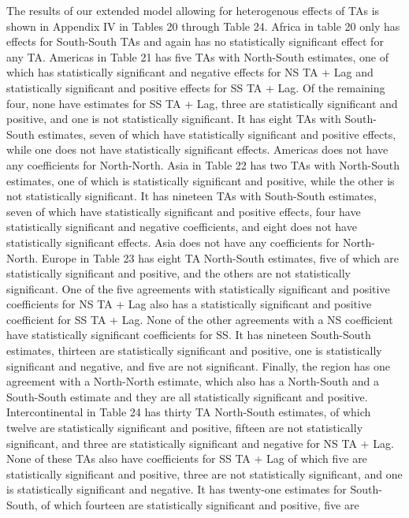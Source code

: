 The results of our extended model allowing for heterogenous effects of
TAs is shown in Appendix IV in Tables 20 through Table 24. Africa in
table 20 only has effects for South-South TAs and again has no
statistically significant effect for any TA. Americas in Table 21 has
five TAs with North-South estimates, one of which has statistically
significant and negative effects for NS TA + Lag and statistically
significant and positive effects for SS TA + Lag. Of the remaining four,
none have estimates for SS TA + Lag, three are statistically significant
and positive, and one is not statistically significant. It has eight TAs
with South-South estimates, seven of which have statistically
significant and positive effects, while one does not have statistically
significant effects. Americas does not have any coefficients for
North-North. Asia in Table 22 has two TAs with North-South estimates,
one of which is statistically significant and positive, while the other
is not statistically significant. It has nineteen TAs with South-South
estimates, seven of which have statistically significant and positive
effects, four have statistically significant and negative coefficients,
and eight does not have statistically significant effects. Asia does not
have any coefficients for North-North. Europe in Table 23 has eight TA
North-South estimates, five of which are statistically significant and
positive, and the others are not statistically significant. One of the
five agreements with statistically significant and positive coefficients
for NS TA + Lag also has a statistically significant and positive
coefficient for SS TA + Lag. None of the other agreements with a NS
coefficient have statistically significant coefficients for SS. It has
nineteen South-South estimates, thirteen are statistically significant
and positive, one is statistically significant and negative, and five
are not significant. Finally, the region has one agreement with a
North-North estimate, which also has a North-South and a South-South
estimate and they are all statistically significant and positive.
Intercontinental in Table 24 has thirty TA North-South estimates, of
which twelve are statistically significant and positive, fifteen are not
statistically significant, and three are statistically significant and
negative for NS TA + Lag. None of these TAs also have coefficients for
SS TA + Lag of which five are statistically significant and positive,
three are not statistically significant, and one is statistically
significant and negative. It has twenty-one estimates for South-South,
of which fourteen are statistically significant and positive, five are
